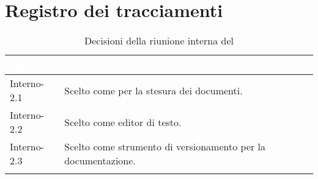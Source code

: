 \section{Registro dei tracciamenti}
{
\renewcommand{\arraystretch}{1.5}
\centering
\begin{longtable}{C{3cm} C{9cm}}
\textcolor{white}{\textbf{Codice}}&
\textcolor{white}{\textbf{Decisione}}\\	
\endhead
		
Interno-2.1 & Scelto  come  per la stesura dei documenti.\\

Interno-2.2 & Scelto  come editor di testo.\\

Interno-2.3 & Scelto  come strumento di versionamento per la documentazione.\\
		
\caption{Decisioni della riunione interna del \Data{}}
\end{longtable}
}
